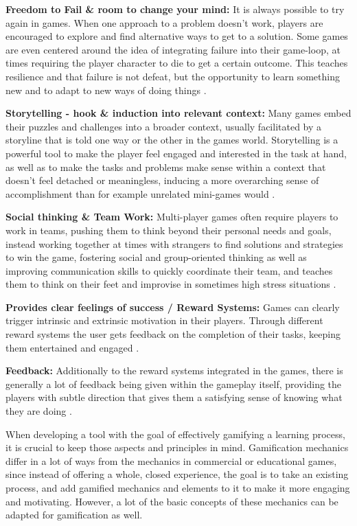 \textbf{Freedom to Fail \& room to change your mind:}
It is always possible to try again in games. When one approach to a problem doesn't work, players are encouraged to explore and find alternative ways to get to a solution. Some games are even centered around the idea of integrating failure into their game-loop, at times requiring the player character to die to get a certain outcome. This teaches resilience and that failure is not defeat, but the opportunity to learn something new and to adapt to new ways of doing things \cite{fail} \cite{framework}.

\textbf{Storytelling - hook \& induction into relevant context:}
Many games embed their puzzles and challenges into a broader context, usually facilitated by a storyline that is told one way or the other in the games world. Storytelling is a powerful tool to make the player feel engaged and interested in the task at hand, as well as to make the tasks and problems make sense within a context that doesn't feel detached or meaningless, inducing a more overarching sense of accomplishment than for example unrelated mini-games would \cite{fail} \cite{aspects}.

\textbf{Social thinking \& Team Work:}
Multi-player games often require players to work in teams, pushing them to think beyond their personal needs and goals, instead working together at times with strangers to find solutions and strategies to win the game, fostering social and group-oriented thinking as well as improving communication skills to quickly coordinate their team, and teaches them to think on their feet and improvise in sometimes high stress situations \cite{framework}.

\textbf{Provides clear feelings of success / Reward Systems:}
Games can clearly trigger intrinsic and extrinsic motivation in their players. Through different reward systems the user gets feedback on the completion of their tasks, keeping them entertained and engaged \cite{equilibrium}.

\textbf{Feedback:}
Additionally to the reward systems integrated in the games, there is generally a lot of feedback being given within the gameplay itself, providing the players with subtle direction that gives them a satisfying sense of knowing what they are doing \cite{framework}.

When developing a tool with the goal of effectively gamifying a learning process, it is crucial to keep those aspects and principles in mind. Gamification mechanics differ in a lot of ways from the mechanics in commercial or educational games, since instead of offering a whole, closed experience, the goal is to take an existing process, and add gamified mechanics and elements to it to make it more engaging and motivating. However, a lot of the basic concepts of these mechanics can be adapted for gamification as well.